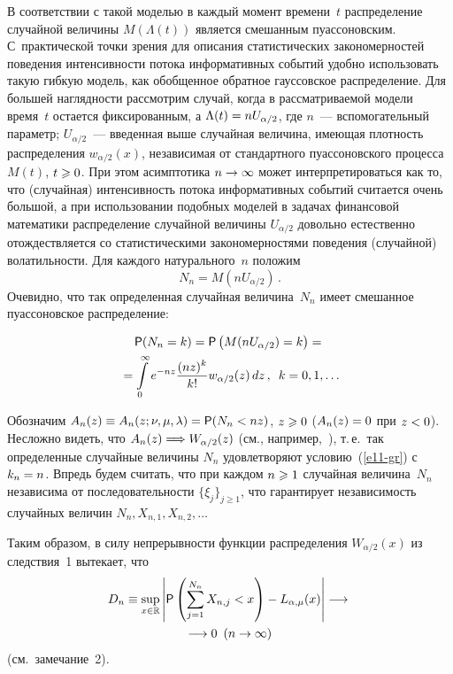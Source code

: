 \begin{multicols}{2}
В соответствии с такой моделью в каждый момент времени~$t$ распределение 
случайной величины $M(\Lambda(t))$ является смешанным пуассоновским. 
С~практической точки зрения для описания статистических закономерностей поведения 
интенсивности потока информативных событий удобно использовать такую гибкую 
модель, как обобщенное обратное гауссовское распределение. Для большей 
наглядности рассмотрим случай, когда в рассматриваемой модели время~$t$ 
остается фиксированным, а $\Lambda(t)\hm=nU_{\alpha/2}$, где $n$~--- 
вспомогательный параметр; $U_{\alpha/2}$~--- введенная выше случайная величина, 
имеющая плотность распределения $w_{\alpha/2}(x)$, независимая от стандартного 
пуассоновского процесса $M(t)$, $t\hm\geqslant0$. При этом асимптотика 
$n\hm\to\infty$ может интерпретироваться как то, что (случайная) интенсивность 
потока информативных событий считается очень большой, а при использовании 
подобных\linebreak
моделей в задачах финансовой математики рас\-пределение случайной 
величины $U_{\alpha/2}$ довольно естествен\-но отождествляется со статистическими 
закономерностями поведения (случайной) волатильности. Для каждого натурального~$n$ положим
$$
N_n=M\left(nU_{\alpha/2}\right)\,.
$$
Очевидно, что так определенная случайная величина~$N_n$ имеет
смешанное пуассоновское распределение:

\noindent
\begin{multline}
{\sf P}(N_n=k)={\sf P}\left(M(nU_{\alpha/2})=k\right)={}\\
{}=
\int\limits_0^{\infty}e^{-nz}\displaystyle\frac{\displaystyle (nz)^k\mathstrut}{\displaystyle k!\mathstrut}w_{\alpha/2}(z)\,dz\,,\enskip
k=0,1,\ldots\label{e13-gr}
\end{multline}

Обозначим $A_n(z)\hm\equiv A_n(z;\nu,\mu,\lambda)\hm={\sf P}(N_n\hm<nz)$, $z\hm\geqslant0$ 
($A_n(z)\hm=0$ при $z\hm<0$). Несложно видеть, что $A_n(z)\hm\Longrightarrow 
W_{\alpha/2}(z)$ (см., например,~\cite{ZaksKorolev2013}), т.\,е.\ так 
определенные случайные величины $N_n$ удовлетворяют условию~(\ref{e11-gr}) с $k_n\hm=n$. 
Впредь будем считать, что при каждом $n\hm\geqslant1$ случайная величина~$N_n$ 
независима от последовательности $\{\xi_j\}_{j\geqslant1}$, что гарантирует 
независимость случайных величин $N_n,X_{n,1},X_{n,2},\ldots$

Таким образом, в силу непрерывности функции распределения
$W_{\alpha/2}(x)$ из следствия~1 вытекает, что
\begin{multline*}
D_n\equiv\sup_{x\in\mathbb{R}}\left\vert{\sf
P}\left(\sum_{j=1}^{N_n}X_{n,j}<x\right)-L_{\alpha,\mu}(x)\right\vert\longrightarrow{}\\
\longrightarrow 0\enskip (n\to\infty)
\end{multline*}
(см.\ замечание~2).
\pagebreak


\end{multicols}
